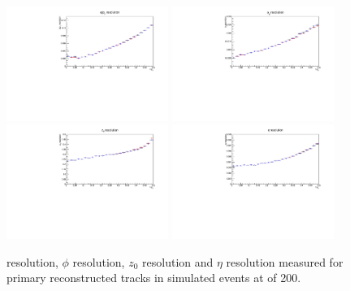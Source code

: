 \begin{figure}[htb]
\centering
\includegraphics[width=0.47\textwidth]{figs/tk-upgrade/results-lowPtTracking/qOverPtResVsInvPtFlatGeometry_5000.pdf}
\includegraphics[width=0.47\textwidth]{figs/tk-upgrade/results-lowPtTracking/phi0ResVsInvPtFlatGeometry_5000.pdf}
\\
\includegraphics[width=0.47\textwidth]{figs/tk-upgrade/results-lowPtTracking/z0ResVsInvPtFlatGeometry_5000.pdf}
\includegraphics[width=0.47\textwidth]{figs/tk-upgrade/results-lowPtTracking/etaResVsInvPtFlatGeometry_5000.pdf}
\caption{
\pt resolution, $\phi$ resolution, $z_{0}$ resolution and $\eta$ resolution measured for primary reconstructed tracks in simulated \ttbar events at \PU of 200.
}
\label{fig:htHelixParametersResVsInvPt}
\end{figure}

